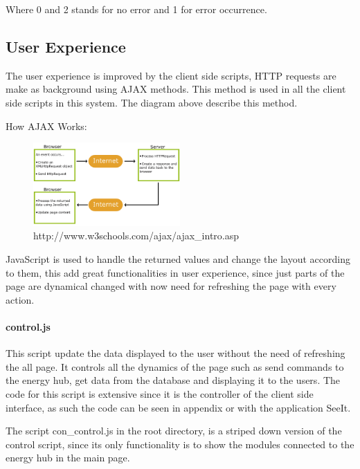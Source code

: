 Where 0 and 2 stands for no error and 1 for error occurrence.

%
%
%
%
%
%


\subsection{User Experience}
The user experience is improved by the client side scripts, HTTP requests are make as background using AJAX methods. This method is used in all the client side scripts in this system. The diagram above describe this method.

How AJAX Works:

\begin{figure}[H]
	\begin{centering}
		\includegraphics[width=0.5\textwidth]{images/ajax.png}
		\caption{http://www.w3schools.com/ajax/ajax\_intro.asp}
	\end{centering}
\end{figure}

JavaScript is used to handle the returned values and change the layout according to them, this add great functionalities in user experience, since just parts of the page are dynamical changed with now need for refreshing the page with every action.

\paragraph{control.js}
This script update the data displayed to the user without the need of refreshing the all page. It controls all the dynamics of the page such as send commands to the energy hub, get data from the database and displaying it to the users. The code for this script is extensive since it is the controller of the client side interface, as such the code can be seen in appendix or with the application SeeIt.

The script con\_control.js in the root directory, is a striped down version of the control script, since its only functionality is to show the modules connected to the energy hub in the main page.

